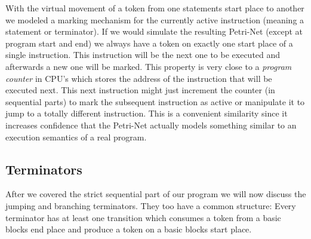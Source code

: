 With the virtual movement of a token from one statements start place to another we modeled a marking mechanism for the currently active instruction (meaning a statement or terminator).
If we would simulate the resulting Petri-Net (except at program start and end) we always have a token on exactly one start place of a single instruction.
This instruction will be the next one to be executed and afterwards a new one will be marked.
This property is very close to a \textit{program counter} in CPU's which stores the address of the instruction that will be executed next.
This next instruction might just increment the counter (in sequential parts) to mark the subsequent instruction as active or manipulate it to jump to a totally different instruction.
This is a convenient similarity since it increases confidence that the Petri-Net actually models something similar to an execution semantics of a real program.

\subsection{Terminators}
\label{terminators}
After we covered the strict sequential part of our program we will now discuss the jumping and branching terminators.
They too have a common structure:
Every terminator has at least one transition which consumes a token from a basic blocks end place and produce a token on a basic blocks start place.


